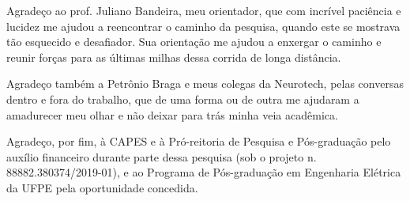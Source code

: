 {    Agrade\c co ao prof. Juliano Bandeira, meu orientador, que com incr\'ivel paci\^encia e lucidez me ajudou a reencontrar o caminho da pesquisa, quando este se mostrava t\~ao esquecido e desafiador. Sua orienta\c c\~ao me ajudou a enxergar o caminho e reunir for\c cas para as \'ultimas milhas dessa corrida de longa dist\^ancia.

    Agrade\c co tamb\'em a Petr\^onio Braga e meus colegas da Neurotech, pelas conversas dentro e fora do trabalho, que de uma forma ou de outra me ajudaram a amadurecer meu olhar e n\~ao deixar para tr\'as minha veia acad\^emica.

    Agrade\c co, por fim, \`a CAPES e \`a Pr\'o-reitoria de Pesquisa e P\'os-gradua\c c\~ao pelo aux\'ilio financeiro durante parte dessa pesquisa (sob o projeto n. 88882.380374/2019-01), e ao Programa de P\'os-gradua\c c\~ao em Engenharia El\'etrica da UFPE pela oportunidade concedida.

}